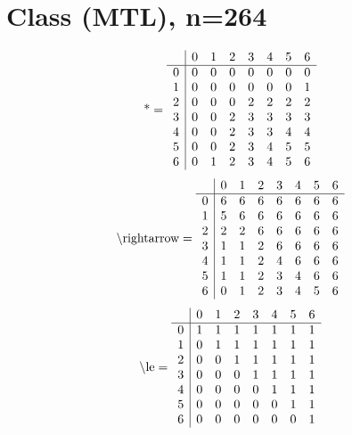 \documentclass[11pt]{article}
\begin{document}
\section{Class (MTL), n=264}
\[\text{*} = 
\begin{array}{r | r r r r r r r}
 & 0 & 1 & 2 & 3 & 4 & 5 & 6 \\ \hline
0 & 0 & 0 & 0 & 0 & 0 & 0 & 0 \\
1 & 0 & 0 & 0 & 0 & 0 & 0 & 1 \\
2 & 0 & 0 & 0 & 2 & 2 & 2 & 2 \\
3 & 0 & 0 & 2 & 3 & 3 & 3 & 3 \\
4 & 0 & 0 & 2 & 3 & 3 & 4 & 4 \\
5 & 0 & 0 & 2 & 3 & 4 & 5 & 5 \\
6 & 0 & 1 & 2 & 3 & 4 & 5 & 6 \\
\end{array}
\]
\[\text{\textbackslash rightarrow} = 
\begin{array}{r | r r r r r r r}
 & 0 & 1 & 2 & 3 & 4 & 5 & 6 \\ \hline
0 & 6 & 6 & 6 & 6 & 6 & 6 & 6 \\
1 & 5 & 6 & 6 & 6 & 6 & 6 & 6 \\
2 & 2 & 2 & 6 & 6 & 6 & 6 & 6 \\
3 & 1 & 1 & 2 & 6 & 6 & 6 & 6 \\
4 & 1 & 1 & 2 & 4 & 6 & 6 & 6 \\
5 & 1 & 1 & 2 & 3 & 4 & 6 & 6 \\
6 & 0 & 1 & 2 & 3 & 4 & 5 & 6 \\
\end{array}
\]
\[\text{\textbackslash le} = 
\begin{array}{r | r r r r r r r}
 & 0 & 1 & 2 & 3 & 4 & 5 & 6 \\ \hline
0 & 1 & 1 & 1 & 1 & 1 & 1 & 1 \\
1 & 0 & 1 & 1 & 1 & 1 & 1 & 1 \\
2 & 0 & 0 & 1 & 1 & 1 & 1 & 1 \\
3 & 0 & 0 & 0 & 1 & 1 & 1 & 1 \\
4 & 0 & 0 & 0 & 0 & 1 & 1 & 1 \\
5 & 0 & 0 & 0 & 0 & 0 & 1 & 1 \\
6 & 0 & 0 & 0 & 0 & 0 & 0 & 1 \\
\end{array}
\]
\end{document}
